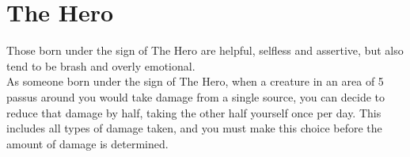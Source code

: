 \section{The Hero}

Those born under the sign of The Hero are helpful, selfless and assertive, but also tend to be brash and overly emotional.\\
As someone born under the sign of The Hero, when a creature in an area of 5 passus around you would take damage from a single source, you can decide to reduce that damage by half, taking the other half yourself once per day. This includes all types of damage taken, and you must make this choice before the amount of damage is determined.\\